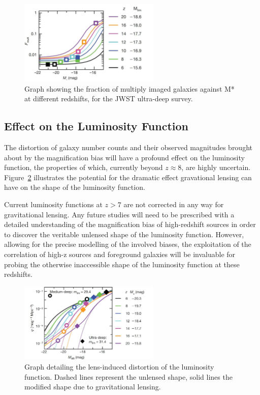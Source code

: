 		\begin{figure}
			\centering
			\includegraphics[width=0.6\textwidth]{../Images/gravjwst1.JPG}
			\caption{Graph showing the fraction of multiply imaged galaxies against M* at different redshifts, for the JWST ultra-deep survey.}\label{fig:gravjwst1}
		\end{figure}

	\subsection{Effect on the Luminosity Function} %
	\label{sub:effect_on_the_luminosity_function}
		The distortion of galaxy number counts and their observed magnitudes brought about by the magnification bias will have a profound effect on the luminosity function, the properties of which, currently beyond $z\approx8$, are highly uncertain. Figure~\ref{fig:gravlumfun} illustrates the potential for the dramatic effect gravational lensing can have on the shape of the luminosity function.

		Current luminosity functions at $z>7$ are not corrected in any way for gravitational lensing. Any future studies will need to be prescribed with a detailed understanding of the magnification bias of high-redshift sources in order to discover the veritable unlensed shape of the luminosity function. However, allowing for the precise modelling of the involved biases, the exploitation of the correlation of high-z sources and foreground galaxies will be invaluable for probing the otherwise inaccessible shape of the luminosity function at these redshifts.
		\begin{figure}
			\centering
			\includegraphics[width=0.6\textwidth]{../Images/gravlumfun.JPG}
			\caption{Graph detailing the lens-induced distortion of the luminosity function. Dashed lines represent the unlensed shape, solid lines the modified shape due to gravitational lensing.}\label{fig:gravlumfun}
		\end{figure}





